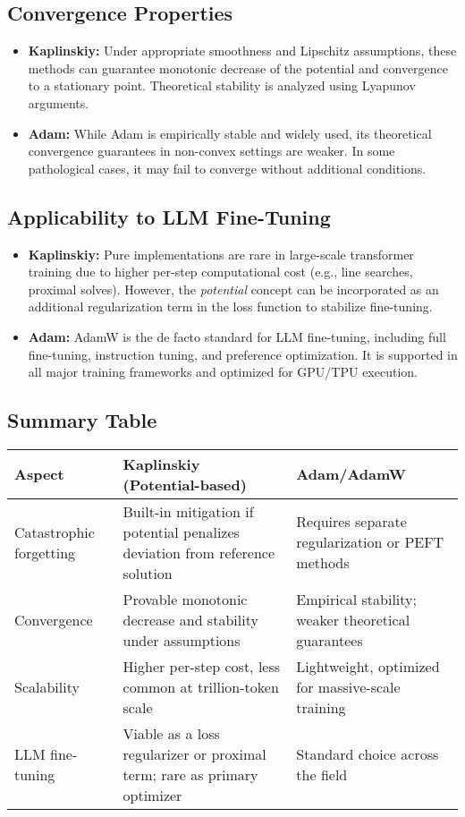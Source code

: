 \documentclass[12pt]{article}
\begin{document}
\subsection{Convergence Properties}
\begin{itemize}
    \item \textbf{Kaplinskiy:} Under appropriate smoothness and Lipschitz assumptions, these methods can guarantee monotonic decrease of the potential and convergence to a stationary point. Theoretical stability is analyzed using Lyapunov arguments.
    \item \textbf{Adam:} While Adam is empirically stable and widely used, its theoretical convergence guarantees in non-convex settings are weaker. In some pathological cases, it may fail to converge without additional conditions.
\end{itemize}

\subsection{Applicability to LLM Fine-Tuning}
\begin{itemize}
    \item \textbf{Kaplinskiy:} Pure implementations are rare in large-scale transformer training due to higher per-step computational cost (e.g., line searches, proximal solves). However, the \emph{potential} concept can be incorporated as an additional regularization term in the loss function to stabilize fine-tuning.
    \item \textbf{Adam:} AdamW is the de facto standard for LLM fine-tuning, including full fine-tuning, instruction tuning, and preference optimization. It is supported in all major training frameworks and optimized for GPU/TPU execution.
\end{itemize}

\subsection{Summary Table}
\begin{center}
\begin{tabular}{|l|p{5cm}|p{5cm}|}
\hline
\textbf{Aspect} & \textbf{Kaplinskiy (Potential-based)} & \textbf{Adam/AdamW} \\
\hline
Catastrophic forgetting & Built-in mitigation if potential penalizes deviation from reference solution & Requires separate regularization or PEFT methods \\
\hline
Convergence & Provable monotonic decrease and stability under assumptions & Empirical stability; weaker theoretical guarantees \\
\hline
Scalability & Higher per-step cost, less common at trillion-token scale & Lightweight, optimized for massive-scale training \\
\hline
LLM fine-tuning & Viable as a loss regularizer or proximal term; rare as primary optimizer & Standard choice across the field \\
\hline
\end{tabular}
\end{center}
\end{document}
